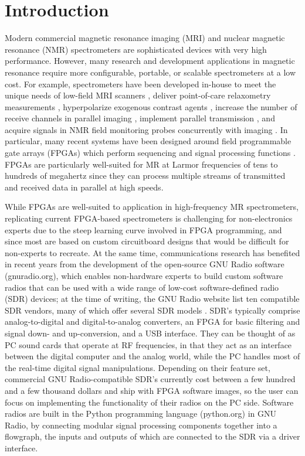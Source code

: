 \documentclass[review]{elsarticle}
\begin{document}
\section{Introduction}
\noindent Modern commercial magnetic resonance imaging (MRI) and nuclear magnetic resonance (NMR) spectrometers are sophisticated devices with very high performance. 
However, many research and development applications in magnetic resonance require more configurable, portable, or scalable spectrometers at a low cost.
For example, spectrometers have been developed in-house to meet the unique needs of low-field MRI scanners \cite{jie:hbmr:2005,wright:2002},
deliver point-of-care relaxometry measurements \cite{peng:domp:2012},
hyperpolarize exogenous contrast agents \cite{parnell:dpns:2008},
increase the number of receive channels in parallel imaging \cite{bodurka:smmd:2004,tang:adrm:2012,stang:medusa:2012},
implement parallel transmission \cite{stang:medusa:2012,Toronto145,4915785},
and acquire signals in NMR field monitoring probes concurrently with imaging \cite{barmet:atrs:2009,sipila:2HTR:2011,sipila:dmrf:2009}. 
In particular, many recent systems have been designed around field programmable gate arrays (FPGAs) which perform sequencing and signal processing functions \cite{gengying:dnmr:2001,jie:hbmr:2005,takeda:ahif:2007,opencorenmr,tang:2011,peng:domp:2012,stang:medusa:2012}.
FPGAs are particularly well-suited for MR at Larmor frequencies of tens to hundreds of megahertz
since they can process multiple streams of transmitted and received data in parallel at high speeds.

\par While FPGAs are well-suited to application in high-frequency MR spectrometers, 
replicating current FPGA-based spectrometers is challenging for non-electronics experts
due to the steep learning curve involved in FPGA programming,
and since most are based on custom circuitboard designs that would be
difficult for non-experts to recreate.
At the same time, communications research has benefited in recent years from the development
of the open-source GNU Radio software (gnuradio.org), 
which enables non-hardware experts to build custom software radios that can be used with a wide range of low-cost 
software-defined radio (SDR) devices; at the time of writing, the GNU Radio website list ten compatible SDR vendors, many of which offer several  SDR models \cite{gnuradiovendors}. 
SDR's typically comprise analog-to-digital and digital-to-analog converters,
an FPGA for basic filtering and signal down- and up-conversion, 
and a USB interface. 
They can be thought of as PC sound cards that operate at RF frequencies, in that
they act as an interface between the digital computer and the analog world, 
while the PC handles most of the real-time digital signal manipulations. 
Depending on their feature set, 
commercial GNU Radio-compatible SDR's currently cost between a few hundred and a few thousand dollars and ship with FPGA software images,
so the user can focus on implementing the functionality of their radios on the PC side.
Software radios are built in the Python programming language (python.org) in GNU Radio, 
by connecting modular signal processing components together
into a flowgraph, the inputs and outputs of which are connected to the SDR via a driver interface. 
\end{document}
